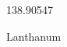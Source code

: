 \documentclass[12pt]{article}
\begin{document}
\hfill{}
\vfill
\begin{center}
  {\fontsize{50}{60}
  }

  \vspace{1em}

  138.90547

Lanthanum
\end{center}
\vfill
\end{document}
